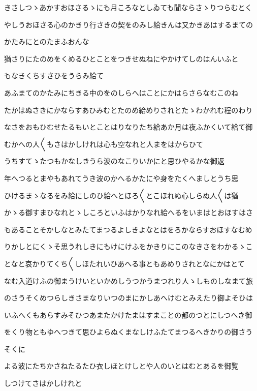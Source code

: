 \documentclass[a4paper,11pt,landscape]{ltjtarticle}
\begin{document}
きさしつゝあかすおほさるゝにも月ころなとしゐても聞ならさゝりつらむとく
\par\medskip
やしうおほさる心のかきり行さきの契をのみし給きんは又かきあはするまての
\par\medskip
かたみにとのたまふおんな
\par\medskip
猶さりにたのめをくめるひとことをつきせぬねにやかけてしのはんいふと
\par\medskip
もなきくちすさひをうらみ給て
\par\medskip
あふまてのかたみにちきる中のをのしらへはことにかはらさらなむこのね
\par\medskip
たかはぬさきにかならすあひみむとたのめ給めりされとたゝわかれむ程のわり
\par\medskip
なさをおもひむせたるもいとことはりなりたち給あか月は夜ふかくいて給て御
\par\medskip
むかへの人〱もさはかしけれは心も空なれと人まをはからひて
\par\medskip
うちすてゝたつもかなしきうら波のなこりいかにと思ひやるかな御返
\par\medskip
年へつるとまやもあれてうき波のかへるかたにや身をたくへましとうち思
\par\medskip
ひけるまゝなるをみ給にしのひ給へとほろ〱とこほれぬ心しらぬ人〱は猶
\par\medskip
かゝる御すまひなれとゝしころといふはかりなれ給へるをいまはとおほすはさ
\par\medskip
もあることそかしなとみたてまつるよしきよなとはをろかならすおほすなむめ
\par\medskip
りかしとにくゝそ思うれしきにもけにけふをかきりにこのなきさをわかるゝこ
\par\medskip
となと哀かりてくち〱しほたれいひあへる事ともあめりされとなにかはとて
\par\medskip
なむ入道けふの御まうけいといかめしうつかうまつれり人ゝしものしなまて旅
\par\medskip
のさうそくめつらしきさまなりいつのまにかしあへけむとみえたり御よそひは
\par\medskip
いふへくもあらすみそひつあまたかけたまはすまことの都のつとにしつへき御
\par\medskip
をくり物ともゆへつきて思ひよらぬくまなしけふたてまつるへきかりの御さう
\par\medskip
そくに
\par\medskip
よる波にたちかさねたるたひ衣しほとけしとや人のいとはむとあるを御覧
\par\medskip
しつけてさはかしけれと
\par\medskip
\end{document}
